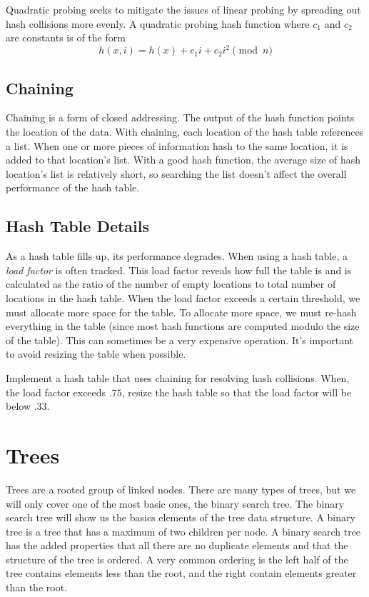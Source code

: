Quadratic probing seeks to mitigate the issues of linear probing by spreading out hash collisions more evenly.   A quadratic probing hash function where $c_1$ and $c_2$ are constants is of the form
\begin{equation*}
h(x, i) = h(x) + c_1i + c_2i^2 \pmod{n}
\end{equation*}

\subsection*{Chaining}
Chaining is a form of closed addressing.  The output of the hash function points the location of the data. 
With chaining, each location of the hash table references a list.
When one or more pieces of information hash to the same location, it is added to that location's list.  With a good hash function, the average size of hash location's list is relatively short, so searching the list doesn't affect the overall performance of the hash table.

\subsection*{Hash Table Details}
As a hash table fills up, its performance degrades.
When using a hash table, a \emph{load factor} is often tracked.
This load factor reveals how full the table is and is calculated as the ratio of the number of empty locations to total number of locations in the hash table.
When the load factor exceeds a certain threshold, we must allocate more space for the table.
To allocate more space, we must re-hash everything in the table (since most hash functions are computed modulo the size of the table).
This can sometimes be a very expensive operation.
It's important to avoid resizing the table when possible.

\begin{problem}
Implement a hash table that uses chaining for resolving hash collisions.
When, the load factor exceeds $.75$, resize the hash table so that the load factor will be below $.33$.
\end{problem}

\section*{Trees}
Trees are a rooted group of linked nodes.  There are many types of trees, but we will only cover one of the most basic ones, the binary search tree.
The binary search tree will show us the basics elements of the tree data structure.
A binary tree is a tree that has a maximum of two children per node.
A binary search tree has the added properties that all there are no duplicate elements
and that the structure of the tree is ordered. 
A very common ordering is the left half of the tree contains elements less than the root, and the right contain elements greater than the root.

